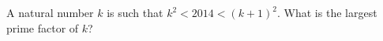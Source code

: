 A natural number $k$ is such that $k^2 < 2014 < (k +1)^2$. What is the largest prime factor of $k$?
